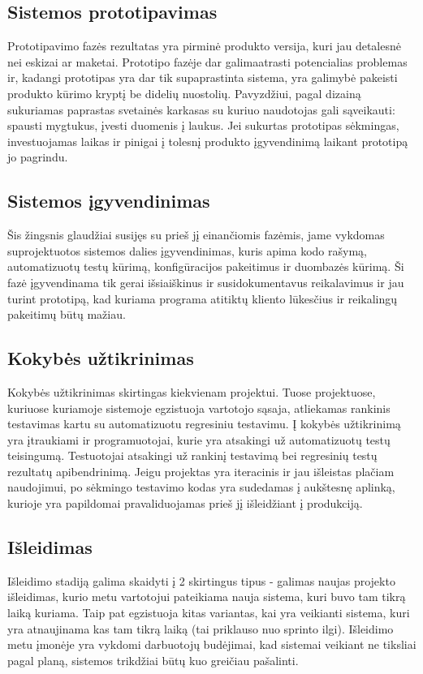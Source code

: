 \documentclass{VUMIFPSkursinis}
\begin{document}
	\subsection{Sistemos prototipavimas}
	Prototipavimo fazės rezultatas yra pirminė produkto versija, kuri jau detalesnė nei eskizai ar maketai. Prototipo fazėje dar galimaatrasti potencialias problemas ir, kadangi prototipas yra dar tik supaprastinta sistema, yra galimybė pakeisti produkto kūrimo kryptį be didelių nuostolių. Pavyzdžiui, pagal dizainą sukuriamas paprastas svetainės karkasas su kuriuo naudotojas gali sąveikauti: spausti mygtukus, įvesti duomenis į laukus. Jei sukurtas prototipas sėkmingas, investuojamas laikas ir pinigai į tolesnį produkto įgyvendinimą laikant prototipą jo pagrindu.
	\subsection{Sistemos įgyvendinimas}
	Šis žingsnis glaudžiai susijęs su prieš jį einančiomis fazėmis, jame vykdomas suprojektuotos sistemos dalies įgyvendinimas, kuris apima kodo rašymą, automatizuotų testų kūrimą, konfigūracijos pakeitimus ir duombazės kūrimą. Ši fazė įgyvendinama tik gerai išsiaiškinus ir susidokumentavus reikalavimus ir jau turint prototipą, kad kuriama programa atitiktų kliento lūkesčius ir reikalingų pakeitimų būtų mažiau.
	\subsection{Kokybės užtikrinimas}
	Kokybės užtikrinimas skirtingas kiekvienam projektui. Tuose projektuose, kuriuose kuriamoje sistemoje egzistuoja vartotojo sąsaja, atliekamas rankinis testavimas kartu su automatizuotu regresiniu testavimu. Į kokybės užtikrinimą yra įtraukiami ir programuotojai, kurie yra atsakingi už automatizuotų testų teisingumą. Testuotojai atsakingi už rankinį testavimą bei regresinių testų rezultatų apibendrinimą. Jeigu projektas yra iteracinis ir jau išleistas plačiam naudojimui, po sėkmingo testavimo kodas yra sudedamas į aukštesnę aplinką, kurioje yra papildomai pravaliduojamas prieš jį išleidžiant į produkciją.
	\subsection{Išleidimas}
	Išleidimo stadiją galima skaidyti į 2 skirtingus tipus - galimas naujas projekto išleidimas, kurio metu vartotojui pateikiama nauja sistema, kuri buvo tam tikrą laiką kuriama. Taip pat egzistuoja kitas variantas, kai yra veikianti sistema, kuri yra atnaujinama kas tam tikrą laiką (tai priklauso nuo sprinto ilgi). Išleidimo metu įmonėje yra vykdomi darbuotojų budėjimai, kad sistemai veikiant ne tiksliai pagal planą, sistemos trikdžiai būtų kuo greičiau pašalinti.
\end{document}
